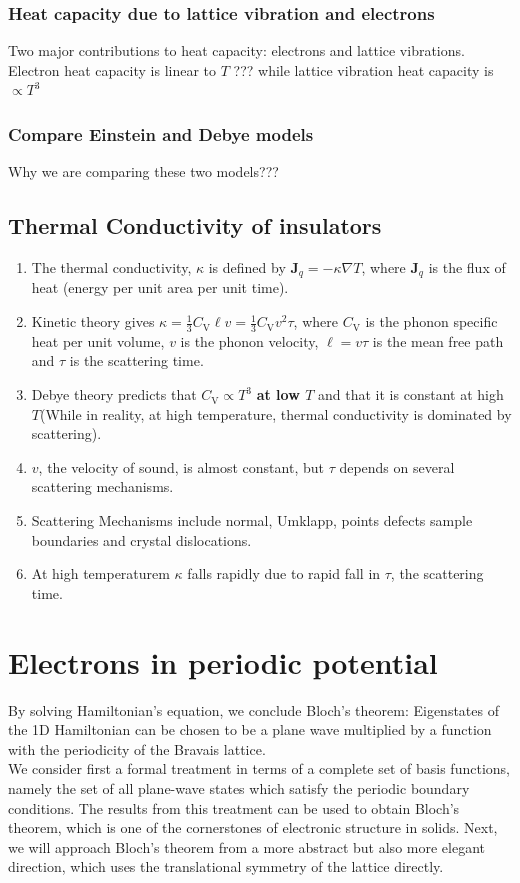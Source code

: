 \documentclass[12pt,a4paper]{article}
\begin{document}
    \subsubsection{Heat capacity due to lattice vibration and electrons}
    Two major contributions to heat capacity: electrons and lattice vibrations. Electron heat capacity is linear to $T$ ??? while lattice vibration heat capacity is $\propto T^3$
    \subsubsection{Compare Einstein and Debye models}
    Why we are comparing these two models???
\subsection{Thermal Conductivity of insulators}
    \begin{enumerate}
        \item The thermal conductivity, $\kappa$ is defined by $\boldsymbol{J}_q=-\kappa \nabla T$, where $\boldsymbol{J}_q$ is the flux of heat (energy per unit area per unit time).
        \item Kinetic theory gives $\kappa=\frac{1}{3} C_{\mathrm{V}} \ell v=\frac{1}{3} C_{\mathrm{V}} v^2 \tau$, where $C_{\mathrm{V}}$ is the phonon specific heat per unit volume, $v$ is the phonon velocity, $\ell=v \tau$ is the mean free path and $\tau$ is the scattering time. 
        \item Debye theory predicts that $C_{\mathrm{V}} \propto T^3$ \textbf{at low $T$} and that it is constant at high $T$(While in reality, at high temperature, thermal conductivity is dominated by scattering). 
        \item $v$, the velocity of sound, is almost constant, but $\tau$ depends on several scattering mechanisms. 
        \item Scattering Mechanisms include normal, Umklapp, points defects sample boundaries and crystal dislocations.
        \item At high temperaturem $\kappa$ falls rapidly due to rapid fall in $\tau$, the scattering time. 
    \end{enumerate}
\section{Electrons in periodic potential}
    By solving Hamiltonian's equation, we conclude Bloch's theorem: Eigenstates of the 1D Hamiltonian can be chosen to be a plane wave multiplied by a function with the periodicity of the Bravais lattice.\\
    We consider first a formal treatment in terms of a complete set of basis functions, namely the set of all plane-wave states which satisfy the periodic boundary conditions. The results from this treatment can be used to obtain Bloch's theorem, which is one of the cornerstones of electronic structure in solids. Next, we will approach Bloch's theorem from a more abstract but also more elegant direction, which uses the translational symmetry of the lattice directly.
\end{document}
